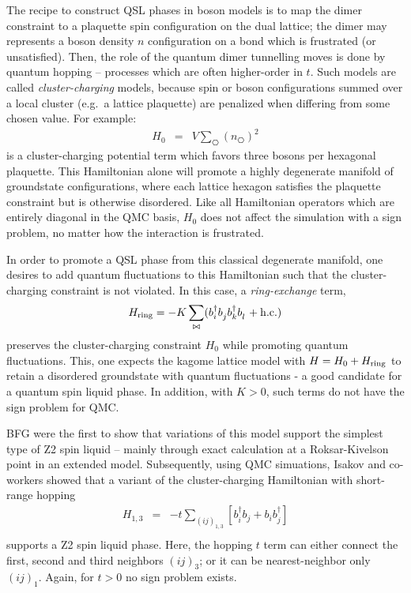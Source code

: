 \documentclass[aps,prb,groupedaddress,twocolumn]{revtex4}
\begin{document}
The recipe to construct QSL phases in boson models is to map the dimer constraint to a plaquette spin configuration on the dual lattice; the dimer may represents a boson density $n$ configuration on a bond which is frustrated (or unsatisfied).  Then, the role of the quantum dimer tunnelling moves is done by quantum hopping -- processes which are often higher-order in $t$.  Such models are called
{\it cluster-charging} models,\cite{Isakov2} because spin or boson configurations summed over a local cluster (e.g.~a lattice plaquette) are penalized when differing from some chosen value.  For example:
\begin{eqnarray}
H_0 &=& V \sum_{\hexagon} (n_{\hexagon})^2 
\end{eqnarray}
is a cluster-charging potential term which favors three bosons per hexagonal plaquette.  This Hamiltonian alone will promote a highly degenerate manifold of groundstate configurations, where each lattice hexagon satisfies the plaquette constraint but is otherwise disordered.  
Like all Hamiltonian operators which are entirely diagonal in the QMC basis, $H_0$ does not affect the simulation with a sign problem, no matter how the interaction is frustrated.

In order to promote a QSL phase from this classical degenerate manifold, one desires to add quantum fluctuations to this Hamiltonian such that the cluster-charging constraint is not violated.  In this case, a {\it ring-exchange} term, 
\begin{eqnarray}
H_{\rm ring} = -K \sum_{\bowtie} ( b_i^{\dagger} b_j^{\phantom\dagger} b_k^{\dagger} b_l^{\phantom\dagger} + {\rm h.c.} )
\end{eqnarray} 
preserves the cluster-charging constraint $H_0$ while promoting quantum fluctuations.  This, one expects the kagome lattice model with $H = H_0 + H_{\rm ring}$ to retain a disordered groundstate with quantum fluctuations - a good candidate for a quantum spin liquid phase.  In addition, with $K>0$, such terms do not have the sign problem for QMC.

BFG were the first to show that variations of this model support the simplest type of Z2 spin liquid -- mainly through exact calculation at a Roksar-Kivelson point in an extended model.\cite{BFG}  Subsequently, using QMC simuations, Isakov and co-workers showed that a variant of the cluster-charging Hamiltonian with short-range hopping 
\begin{eqnarray}
H_{1,3} &=& -t \sum_{( ij )_{1,3}} [b^{\dagger}_i b_j + b_i b^{\dagger}_j]  \\
\end{eqnarray}
supports a Z2 spin liquid phase.  Here, the hopping $t$ term can either connect the first, second and third neighbors $( ij )_3$; or it can be nearest-neighbor only $( ij )_1$.  Again, for $t>0$ no sign problem exists.
\end{document}
